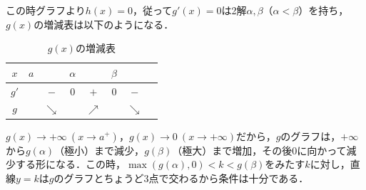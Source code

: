 \documentclass[../../main.tex]{subfiles}
\begin{document}
この時グラフより$h(x)=0$，従って$g'(x)=0$は2解$\alpha,\beta$（$\alpha<\beta$）を持ち，$g(x)$の増減表は以下のようになる．

\begin{table}[htb]
  \centering
  \caption{$g(x)$の増減表}
  \begin{tabular}{c|ccccccc}
    $x$ & $a$ & & $\alpha$ & & $\beta$ & & \\
    \hline
    $g'$ & & $-$ & $0$ & $+$ & $0$ & $-$ & \\
    \hline
    $g$ & & $\searrow$ & & $\nearrow$ & & $\searrow$ &
  \end{tabular}
\end{table}

$g(x)\to+\infty\ (x\to a^+)$，$g(x)\to0\ (x\to+\infty)$だから，$g$のグラフは，$+\infty$から$g(\alpha)$（極小）まで減少，$g(\beta)$（極大）まで増加，その後$0$に向かって減少する形になる．この時，$\max\left(g(\alpha),0\right)<k<g(\beta)$をみたす$k$に対し，直線$y=k$は$g$のグラフとちょうど3点で交わるから条件は十分である．
\end{document}
